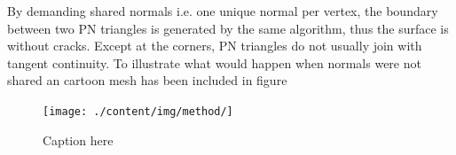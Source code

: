 By demanding shared normals i.e. one unique normal per vertex, the boundary between two PN triangles is generated by the same algorithm, thus the surface is without cracks. Except at the corners, PN triangles do not usually join with tangent continuity. To illustrate what would happen when normals were not shared an cartoon mesh has been included in figure 

\begin{figure}
	\centering
	\texttt{[image: ./content/img/method/]}
	\caption{Caption here}
	\label{fig::}
\end{figure}
%
%
